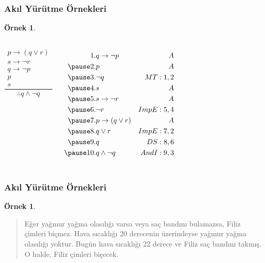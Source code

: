 \documentclass[dvipsnames]{beamer}
\theoremstyle{definition}
\theoremstyle{example}
\newtheorem{ornek}[theorem]{Örnek}
\theoremstyle{plain}
\begin{document}
\begin{frame}
  \frametitle{Akıl Yürütme Örnekleri}

  \begin{ornek}
    \begin{columns}
      \[
      \frac
        {
          \begin{array}{c}
            p \rightarrow (q \vee r)\\
            s \rightarrow \neg r\\
            q \rightarrow \neg p\\
            p\\
            s
          \end{array}
        }
        {
          \therefore q \wedge \neg q
        }
      \]

      \pause
      \begin{eqnarray*}
        1. & q \rightarrow \neg p     & A\\
       \pause
        2. & p                        & A\\
       \pause
        3. & \neg q                   & MT:1,2\\
       \pause
        4. & s                        & A\\
       \pause
        5. & s \rightarrow \neg r     & A\\
       \pause
        6. & \neg r                   & ImpE:5,4\\
       \pause
        7. & p \rightarrow (q \vee r) & A\\
       \pause
        8. & q \vee r                 & ImpE:7,2\\
       \pause
        9. & q                        & DS:8,6\\
       \pause
       10. & q \wedge \neg q          & AndI:9,3
      \end{eqnarray*}
    \end{columns}
  \end{ornek}
\end{frame}

\begin{frame}
  \frametitle{Akıl Yürütme Örnekleri}

  \begin{ornek}
    \begin{quote}
      Eğer yağmur yağma olasılığı varsa veya saç bandını bulamazsa, Filiz
      çimleri biçmez. Hava sıcaklığı 20 derecenin üzerindeyse yağmur yağma
      olasılığı yoktur. Bugün hava sıcaklığı 22 derece ve Filiz saç bandını
      takmış. O halde, Filiz çimleri biçecek.
    \end{quote}
  \end{ornek}
\end{frame}
\end{document}
